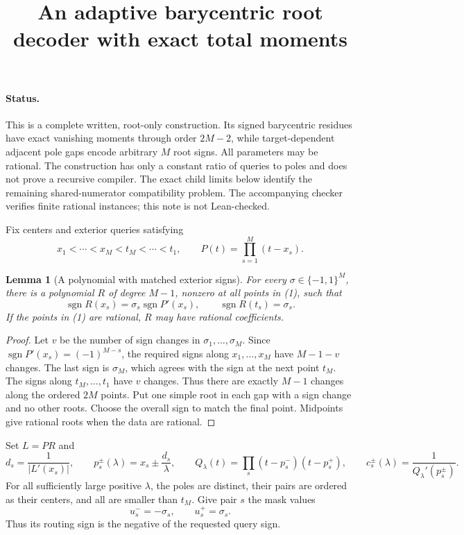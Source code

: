 \documentclass[11pt]{article}
\title{An adaptive barycentric root decoder with exact total moments}
\author{}\date{}
\newtheorem{lemma}{Lemma}
\begin{document}
\maketitle

\paragraph{Status.}
This is a complete written, root-only construction. Its signed
barycentric residues have exact vanishing moments through order
$2M-2$, while target-dependent adjacent pole gaps encode arbitrary
$M$ root signs. All parameters may be rational. The construction
has only a constant ratio of queries to poles and does not prove a
recursive compiler. The exact child limits below identify the
remaining shared-numerator compatibility problem. The accompanying
checker verifies finite rational instances; this note is not
Lean-checked.

Fix centers and exterior queries satisfying
\[
 x_1<\cdots<x_M<t_M<\cdots<t_1,\qquad
 P(t)=\prod_{s=1}^M(t-x_s).                                  \tag{1}
\]

\begin{lemma}[A polynomial with matched exterior signs]
For every $\sigma\in\{-1,1\}^M$, there is a polynomial $R$ of
degree $M-1$, nonzero at all points in (1), such that
\[
 \operatorname{sgn}R(x_s)=\sigma_s\operatorname{sgn}P'(x_s),
 \qquad \operatorname{sgn}R(t_s)=\sigma_s.                    \tag{2}
\]
If the points in (1) are rational, $R$ may have rational coefficients.
\end{lemma}
\begin{proof}
Let $v$ be the number of sign changes in $\sigma_1,\ldots,\sigma_M$.
Since $\operatorname{sgn}P'(x_s)=(-1)^{M-s}$, the required signs
along $x_1,\ldots,x_M$ have $M-1-v$ changes. The last sign is
$\sigma_M$, which agrees with the sign at the next point $t_M$.
The signs along $t_M,\ldots,t_1$ have $v$ changes. Thus there are
exactly $M-1$ changes along the ordered $2M$ points. Put one simple
root in each gap with a sign change and no other roots. Choose the
overall sign to match the final point. Midpoints give rational roots
when the data are rational.
\end{proof}

Set $L=PR$ and
\[
 d_s=\frac1{|L'(x_s)|},\qquad
 p_s^\pm(\lambda)=x_s\pm\frac{d_s}{\lambda},\qquad
 Q_\lambda(t)=\prod_s(t-p_s^-)(t-p_s^+),\qquad
 c_s^\pm(\lambda)=\frac1{Q_\lambda'(p_s^\pm)}.                \tag{3}
\]
For all sufficiently large positive $\lambda$, the poles are
distinct, their pairs are ordered as their centers, and all are
smaller than $t_M$. Give pair $s$ the mask values
\[
                  u_s^-=-\sigma_s,\qquad u_s^+=\sigma_s.     \tag{4}
\]
Thus its routing sign is the negative of the requested query sign.
\end{document}
